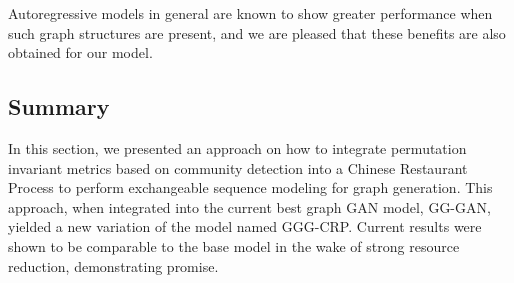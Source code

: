 Autoregressive models in general are known to show greater performance when such graph structures are present, and we are pleased that these benefits are also obtained for our model.

\subsection{Summary}
\label{sec:conclusion}

In this section, we presented an approach on how to integrate permutation invariant metrics based on community detection into a Chinese Restaurant Process to perform exchangeable sequence modeling for graph generation. This approach, when integrated into the current best graph GAN model, GG-GAN, yielded a new variation of the model named GGG-CRP. Current results were shown to be comparable to the base model in the wake of strong resource reduction, demonstrating promise. 